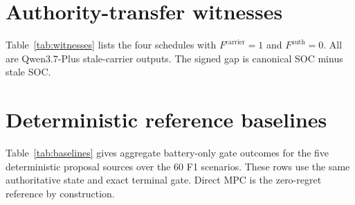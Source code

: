 \documentclass[11pt]{article}
\begin{document}
\section{Authority-transfer witnesses}
\label{app:witnesses}

Table~\ref{tab:witnesses} lists the four schedules with
$F^{\mathrm{carrier}}=1$ and $F^{\mathrm{auth}}=0$. All are Qwen3.7-Plus stale-carrier outputs.
The signed gap is canonical SOC minus stale SOC.

\begin{table}[!htbp]
\centering
\caption{Saved authority-transfer failures. Terminal errors are absolute kWh.}
\label{tab:witnesses}
\small
{}
\end{table}

\section{Deterministic reference baselines}
\label{app:baselines}

Table~\ref{tab:baselines} gives aggregate battery-only gate outcomes for the five deterministic
proposal sources over the 60 F1 scenarios. These rows use the same authoritative state and exact
terminal gate. Direct MPC is the zero-regret reference by construction.

\begin{table}[!htbp]
\centering
\caption{Deterministic proposal baselines under the common battery-only gate.}
\label{tab:baselines}
\small
{}
\end{table}

\begingroup
\small


\endgroup
\end{document}

